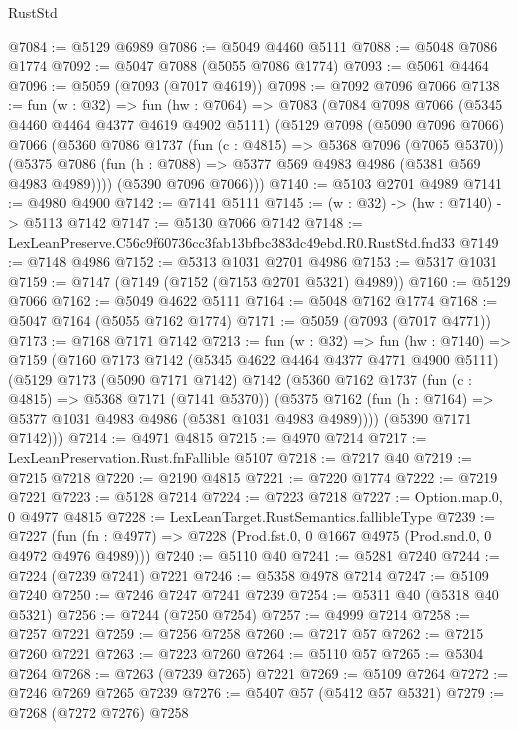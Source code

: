 \begin{lexlean}{RustStd}
\begin{coremodule}
@7084 := @5129 @6989
@7086 := @5049 @4460 @5111
@7088 := @5048 @7086 @1774
@7092 := @5047 @7088 (@5055 @7086 @1774)
@7093 := @5061 @4464
@7096 := @5059 (@7093 (@7017 @4619))
@7098 := @7092 @7096 @7066
@7138 := fun (w : @32) =>
  fun (hw : @7064) =>
  @7083
    (@7084
      @7098
      @7066
      (@5345 @4460 @4464 @4377 @4619 @4902 @5111)
      (@5129
        @7098
        (@5090 @7096 @7066)
        @7066
        (@5360
          @7086
          @1737
          (fun (c : @4815) => @5368 @7096 (@7065 @5370))
          (@5375 @7086 (fun (h : @7088) => @5377 @569 @4983 @4986 (@5381 @569 @4983 @4989))))
        (@5390 @7096 @7066)))
@7140 := @5103 @2701 @4989
@7141 := @4980 @4900
@7142 := @7141 @5111
@7145 := (w : @32) -> (hw : @7140) -> @5113 @7142
@7147 := @5130 @7066 @7142
@7148 := LexLeanPreserve.C56c9f60736cc3fab13bfbc383dc49ebd.R0.RustStd.fnd33
@7149 := @7148 @4986
@7152 := @5313 @1031 @2701 @4986
@7153 := @5317 @1031
@7159 := @7147 (@7149 (@7152 (@7153 @2701 @5321) @4989))
@7160 := @5129 @7066
@7162 := @5049 @4622 @5111
@7164 := @5048 @7162 @1774
@7168 := @5047 @7164 (@5055 @7162 @1774)
@7171 := @5059 (@7093 (@7017 @4771))
@7173 := @7168 @7171 @7142
@7213 := fun (w : @32) =>
  fun (hw : @7140) =>
  @7159
    (@7160
      @7173
      @7142
      (@5345 @4622 @4464 @4377 @4771 @4900 @5111)
      (@5129
        @7173
        (@5090 @7171 @7142)
        @7142
        (@5360
          @7162
          @1737
          (fun (c : @4815) => @5368 @7171 (@7141 @5370))
          (@5375 @7162 (fun (h : @7164) => @5377 @1031 @4983 @4986 (@5381 @1031 @4983 @4989))))
        (@5390 @7171 @7142)))
@7214 := @4971 @4815
@7215 := @4970 @7214
@7217 := LexLeanPreservation.Rust.fnFallible @5107
@7218 := @7217 @40
@7219 := @7215 @7218
@7220 := @2190 @4815
@7221 := @7220 @1774
@7222 := @7219 @7221
@7223 := @5128 @7214
@7224 := @7223 @7218
@7227 := Option.map.{0, 0} @4977 @4815
@7228 := LexLeanTarget.RustSemantics.fallibleType
@7239 := @7227
    (fun (fn : @4977) => @7228 (Prod.fst.{0, 0} @1667 @4975 (Prod.snd.{0, 0} @4972 @4976 @4989)))
@7240 := @5110 @40
@7241 := @5281 @7240
@7244 := @7224 (@7239 @7241) @7221
@7246 := @5358 @4978 @7214
@7247 := @5109 @7240
@7250 := @7246 @7247 @7241 @7239
@7254 := @5311 @40 (@5318 @40 @5321)
@7256 := @7244 (@7250 @7254)
@7257 := @4999 @7214
@7258 := @7257 @7221
@7259 := @7256 @7258
@7260 := @7217 @57
@7262 := @7215 @7260 @7221
@7263 := @7223 @7260
@7264 := @5110 @57
@7265 := @5304 @7264
@7268 := @7263 (@7239 @7265) @7221
@7269 := @5109 @7264
@7272 := @7246 @7269 @7265 @7239
@7276 := @5407 @57 (@5412 @57 @5321)
@7279 := @7268 (@7272 @7276) @7258

\end{coremodule}
\end{lexlean}
